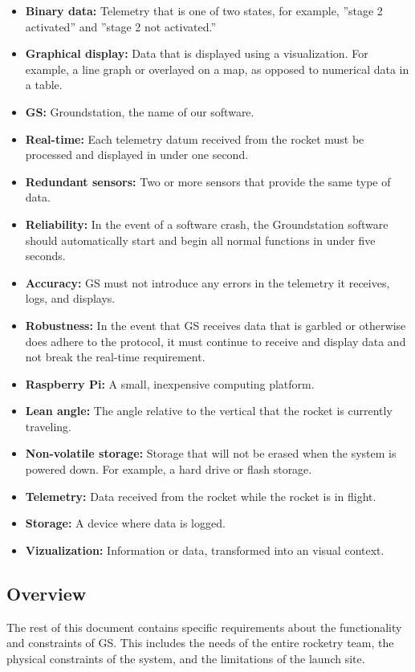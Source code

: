 \documentclass[10pt,journal,draftclsnofoot,onecolumn]{IEEEtran}
\begin{document}
	\begin{itemize}
		\item \textbf{Binary data:} Telemetry that is one of two states, for example, ''stage 2 activated'' and
		''stage 2 not activated.''
		\item \textbf{Graphical display:} Data that is displayed using a visualization. For example, a line graph or overlayed
		on a map, as opposed to numerical data in a table.
		\item \textbf{GS:} Groundstation, the name of our software.
		\item \textbf{Real-time:} Each telemetry datum received from the rocket must be processed and
		displayed in under one second.
		\item \textbf{Redundant sensors:} Two or more sensors that provide the same type of data.
		\item \textbf{Reliability:} In the event of a software crash, the Groundstation software should automatically
		start and begin all normal functions in under five seconds.
		\item \textbf{Accuracy:} GS must not introduce any errors in the telemetry it receives, logs, and displays.
		\item \textbf{Robustness:} In the event that GS receives data that is garbled or otherwise does adhere
		to the protocol, it must continue to receive and display data and not break the real-time requirement.
		\item \textbf{Raspberry Pi:} A small, inexpensive computing platform.
		\item \textbf{Lean angle:} The angle relative to the vertical that the rocket is currently traveling.
		\item \textbf{Non-volatile storage:} Storage that will not be erased when the system is powered down.
		For example, a hard drive or flash storage.
		\item \textbf{Telemetry:} Data received from the rocket while the rocket is in flight.
		\item \textbf{Storage:} A device where data is logged.
		\item \textbf{Vizualization:} Information or data, transformed into an visual context.
	\end{itemize}	
	
	\subsection{Overview}
	The rest of this document contains specific requirements about the functionality and constraints of GS. This includes
	the needs of the entire rocketry team, the physical constraints of the system, and the limitations of the launch site.
	
\end{document}
